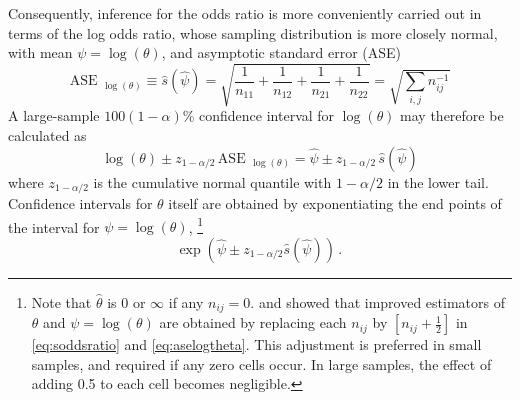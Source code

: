 \documentclass[10pt,krantz2]{krantz}\usepackage[]{graphicx}\usepackage[]{color}
\begin{document}
Consequently, inference for the odds ratio
is more conveniently carried out in terms of the log odds ratio,
whose sampling distribution is more closely normal, with mean
$\psi = \log (\theta)$, and asymptotic standard error (ASE)
\begin{equation}\label{eq:aselogtheta}
 \mbox{ASE }_{\log (\theta)} \equiv \hat{s} (\hat{\psi}) = \sqrt{
 \frac{1}{n_{11}} + \frac{1}{n_{12}} + \frac{1}{n_{21}} + \frac{1}{n_{22}}
 }
 =   \sqrt{ \sum_{i,j} n_{ij}^{-1}}
\end{equation}
A large-sample $100(1-\alpha)$\% confidence interval for $\log (\theta)$ may therefore
be calculated as
\begin{equation*}
\log (\theta) \pm z_{1-\alpha/2} \, \mbox{ASE }_{\log (\theta)}
= \hat{\psi} \pm z_{1-\alpha/2}  \, \hat{s} (\hat{\psi})
\end{equation*}
where $z_{ 1 - \alpha  / 2 }$ is the cumulative normal quantile with
$1-\alpha/2$ in the lower tail.
Confidence intervals for $\theta$ itself are obtained by exponentiating
the end points of the interval for $\psi = \log (\theta)$,%
\footnote{
Note that $\hat{\theta}$ is 0 or $\infty$ if any $n_{ij}=0$.
\citet{Haldane:55} and \citet{GartZweiful:67} showed that improved
estimators of $\theta$ and $\psi = \log (\theta)$ are obtained by
replacing each $n_{ij}$ by $[n_{ij} + \frac{1}{2}]$ in \eqref{eq:soddsratio}
and \eqref{eq:aselogtheta}.
This adjustment is preferred in small samples, and required if any
zero cells occur.  In large samples, the effect of adding 0.5 to each
cell becomes negligible.
}
\begin{equation*}
\exp \left(\hat{\psi}  \pm z_{ 1 - \alpha  / 2 } \hat{s} (\hat{\psi}) \right)
\period
\end{equation*}
\end{document}
